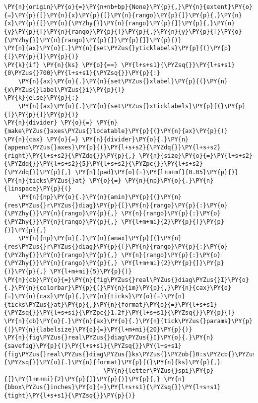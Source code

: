 \begin{Verbatim}[commandchars=\\\{\}]
        \PY{n}{origin}\PY{o}{=}\PY{n+nb+bp}{None}\PY{p}{,}\PY{n}{extent}\PY{o}{=}\PY{p}{[}\PY{n}{x}\PY{p}{[}\PY{n}{rango}\PY{p}{]}\PY{p}{,}\PY{n}{x}\PY{p}{[}\PY{o}{\PYZhy{}}\PY{n}{rango}\PY{p}{]}\PY{p}{,}\PY{n}{y}\PY{p}{[}\PY{n}{rango}\PY{p}{]}\PY{p}{,}\PY{n}{y}\PY{p}{[}\PY{o}{\PYZhy{}}\PY{n}{rango}\PY{p}{]}\PY{p}{]}\PY{p}{)}
\PY{n}{ax}\PY{o}{.}\PY{n}{set\PYZus{}yticklabels}\PY{p}{(}\PY{p}{[}\PY{p}{]}\PY{p}{)}
\PY{k}{if} \PY{n}{ks} \PY{o}{==} \PY{l+s+s1}{\PYZsq{}}\PY{l+s+s1}{0\PYZus{}700}\PY{l+s+s1}{\PYZsq{}}\PY{p}{:}
    \PY{n}{ax}\PY{o}{.}\PY{n}{set\PYZus{}xlabel}\PY{p}{(}\PY{n}{x\PYZus{}label\PYZus{}i}\PY{p}{)}
\PY{k}{else}\PY{p}{:}
    \PY{n}{ax}\PY{o}{.}\PY{n}{set\PYZus{}xticklabels}\PY{p}{(}\PY{p}{[}\PY{p}{]}\PY{p}{)}
\PY{n}{divider} \PY{o}{=} \PY{n}{make\PYZus{}axes\PYZus{}locatable}\PY{p}{(}\PY{n}{ax}\PY{p}{)}
\PY{n}{cax} \PY{o}{=} \PY{n}{divider}\PY{o}{.}\PY{n}{append\PYZus{}axes}\PY{p}{(}\PY{l+s+s2}{\PYZdq{}}\PY{l+s+s2}{right}\PY{l+s+s2}{\PYZdq{}}\PY{p}{,} \PY{n}{size}\PY{o}{=}\PY{l+s+s2}{\PYZdq{}}\PY{l+s+s2}{5}\PY{l+s+s2}{\PYZpc{}}\PY{l+s+s2}{\PYZdq{}}\PY{p}{,} \PY{n}{pad}\PY{o}{=}\PY{l+m+mf}{0.05}\PY{p}{)}
\PY{n}{ticks\PYZus{}at} \PY{o}{=} \PY{n}{np}\PY{o}{.}\PY{n}{linspace}\PY{p}{(}
    \PY{n}{np}\PY{o}{.}\PY{n}{amin}\PY{p}{(}\PY{n}{res\PYZus{}r\PYZus{}diag}\PY{p}{[}\PY{n}{rango}\PY{p}{:}\PY{o}{\PYZhy{}}\PY{n}{rango}\PY{p}{,} \PY{n}{rango}\PY{p}{:}\PY{o}{\PYZhy{}}\PY{n}{rango}\PY{p}{,} \PY{l+m+mi}{2}\PY{p}{]}\PY{p}{)}\PY{p}{,}
    \PY{n}{np}\PY{o}{.}\PY{n}{amax}\PY{p}{(}\PY{n}{res\PYZus{}r\PYZus{}diag}\PY{p}{[}\PY{n}{rango}\PY{p}{:}\PY{o}{\PYZhy{}}\PY{n}{rango}\PY{p}{,} \PY{n}{rango}\PY{p}{:}\PY{o}{\PYZhy{}}\PY{n}{rango}\PY{p}{,} \PY{l+m+mi}{2}\PY{p}{]}\PY{p}{)}\PY{p}{,} \PY{l+m+mi}{5}\PY{p}{)}
\PY{n}{cb}\PY{o}{=}\PY{n}{fig\PYZus{}real\PYZus{}diag\PYZus{}I}\PY{o}{.}\PY{n}{colorbar}\PY{p}{(}\PY{n}{im}\PY{p}{,}\PY{n}{cax}\PY{o}{=}\PY{n}{cax}\PY{p}{,}\PY{n}{ticks}\PY{o}{=}\PY{n}{ticks\PYZus{}at}\PY{p}{,}\PY{n}{format}\PY{o}{=}\PY{l+s+s1}{\PYZsq{}}\PY{l+s+si}{\PYZpc{}1.2f}\PY{l+s+s1}{\PYZsq{}}\PY{p}{)}
\PY{n}{cb}\PY{o}{.}\PY{n}{ax}\PY{o}{.}\PY{n}{tick\PYZus{}params}\PY{p}{(}\PY{n}{labelsize}\PY{o}{=}\PY{l+m+mi}{20}\PY{p}{)}
\PY{n}{fig\PYZus{}real\PYZus{}diag\PYZus{}I}\PY{o}{.}\PY{n}{savefig}\PY{p}{(}\PY{l+s+s1}{\PYZsq{}}\PY{l+s+s1}{fig\PYZus{}real\PYZus{}diag\PYZus{}ks\PYZus{}\PYZob{}0:s\PYZcb{}\PYZus{}\PYZob{}1:s\PYZcb{}}\PY{l+s+s1}{\PYZsq{}}\PY{o}{.}\PY{n}{format}\PY{p}{(}\PY{n}{ks}\PY{p}{,}
                            \PY{n}{letter\PYZus{}spi}\PY{p}{[}\PY{l+m+mi}{2}\PY{p}{]}\PY{p}{)}\PY{p}{,} \PY{n}{bbox\PYZus{}inches}\PY{o}{=}\PY{l+s+s1}{\PYZsq{}}\PY{l+s+s1}{tight}\PY{l+s+s1}{\PYZsq{}}\PY{p}{)}
\end{Verbatim}

